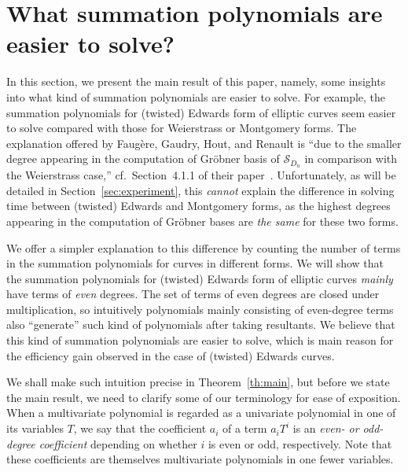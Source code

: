 \section{What summation polynomials are easier to solve?}
\label{sec:twisted-edwards-summation-polynomial}

In this section, we present the main result of this paper, namely,
some insights into what kind of summation polynomials are easier to
solve.
%
For example, the summation polynomials for (twisted) Edwards form of
elliptic curves seem easier to solve compared with those for
Weierstrass or Montgomery forms.
%
The explanation offered by Faug\`ere, Gaudry, Hout, and Renault is
``due to the smaller degree appearing in the computation of Gr\"obner
basis of $\mathscr S_{D_n}$ in comparison with the Weierstrass case,''
cf.~Section~4.1.1 of their
paper~\cite{DBLP:journals/joc/FaugereGHR14}.
%
Unfortunately, as will be detailed in Section~\ref{sec:experiment},
this \emph{cannot} explain the difference in solving time between
(twisted) Edwards and Montgomery forms, as the highest degrees
appearing in the computation of Gr\"obner bases are \emph{the same}
for these two forms.

We offer a simpler explanation to this difference by counting the
number of terms in the summation polynomials for curves in different
forms.
%
We will show that the summation polynomials for (twisted) Edwards form
of elliptic curves \emph{mainly} have terms of \emph{even} degrees.
%
The set of terms of even degrees are closed under multiplication, so
intuitively polynomials mainly consisting of even-degree terms also
``generate'' such kind of polynomials after taking resultants.
%
We believe that this kind of summation polynomials are easier to
solve, which is main reason for the efficiency gain observed in the
case of (twisted) Edwards curves.

We shall make such intuition precise in Theorem~\ref{th:main}, but
before we state the main result, we need to clarify some of our
terminology for ease of exposition.
%
When a multivariate polynomial is regarded as a univariate polynomial
in one of its variables $T$, we say that the coefficient $a_i$ of a
term $a_iT^i$ is an \emph{even- or odd-degree coefficient} depending
on whether $i$ is even or odd, respectively.
%
Note that these coefficients are themselves multivariate polynomials
in one fewer variables.

